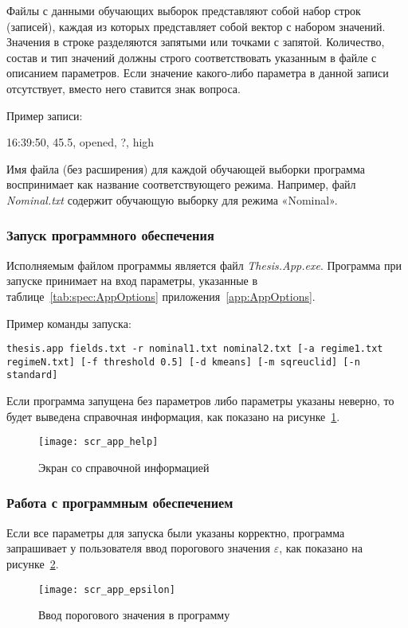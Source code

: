 Файлы с данными обучающих выборок представляют собой набор строк (записей), каждая из которых представляет собой вектор с набором значений. Значения в строке разделяются запятыми или точками с запятой. Количество, состав и тип значений должны строго соответствовать указанным в файле с описанием параметров. Если значение какого-либо параметра в данной записи отсутствует, вместо него ставится знак вопроса.

Пример записи:

\textsf{16:39:50, 45.5, opened, ?, high}

Имя файла (без расширения) для каждой обучающей выборки программа воспринимает как название соответствующего режима. Например, файл \textit{Nominal.txt} содержит обучающую выборку для режима «Nominal».

\subsubsection{Запуск программного обеспечения}
Исполняемым файлом программы является файл \textit{Thesis.App.exe}. Программа при запуске принимает на вход параметры, указанные в таблице~\ref{tab:spec:AppOptions} приложения~\ref{app:AppOptions}.

Пример команды запуска:

\texttt{thesis.app fields.txt -r nominal1.txt nominal2.txt [-a regime1.txt regimeN.txt] [-f threshold 0.5] [-d kmeans] [-m sqreuclid] [-n standard]}

Если программа запущена без параметров либо параметры указаны неверно, то будет выведена справочная информация, как показано на рисунке~\ref{fig:spec:scr:AppHelp}.

\begin{figure}[h]
\texttt{[image: scr\_app\_help]}
\caption{Экран со справочной информацией}
\label{fig:spec:scr:AppHelp}
\end{figure}

\subsubsection{Работа с программным обеспечением}
Если все параметры для запуска были указаны корректно, программа запрашивает у пользователя ввод порогового значения $\varepsilon$, как показано на рисунке~\ref{fig:spec:scr:EnterEpsilon}.

\begin{figure}[h]
\texttt{[image: scr\_app\_epsilon]}
\caption{Ввод порогового значения в программу}
\label{fig:spec:scr:EnterEpsilon}
\end{figure}

